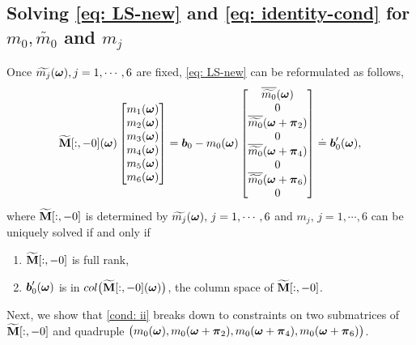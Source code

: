 \subsection{Solving \eqref{eq: LS-new} and \eqref{eq: identity-cond} for $m_0,\widetilde{m_0}$ and $m_j$}\label{subsec: compute-m0}
Once $\widetilde{m_{j}}(\boldsymbol{\omega}), j= 1,\cdots, 6$ are fixed, \eqref{eq: LS-new} can be reformulated as follows,
\begin{align}\label{eq: mj-eq}
\widetilde{\mathbf{M}}[:,-0](\boldsymbol{\omega}) 
\begin{bmatrix}
m_1(\boldsymbol{\omega})\\
m_2(\boldsymbol{\omega})\\
m_3(\boldsymbol{\omega})\\
m_4(\boldsymbol{\omega})\\
m_5(\boldsymbol{\omega})\\
m_6(\boldsymbol{\omega})
\end{bmatrix}
= \boldsymbol{b}_0 - m_0(\boldsymbol{\omega})
\begin{bmatrix}
 \overline{\widetilde{m_0}}(\boldsymbol{\omega})\\
 0\\
\overline{\widetilde{m_{0}}}(\boldsymbol{\omega} + \boldsymbol{\pi}_{2})\\
0\\
\overline{\widetilde{m_{0}}}(\boldsymbol{\omega} + \boldsymbol{\pi}_{4})\\
0\\
\overline{\widetilde{m_{0}}}(\boldsymbol{\omega} + \boldsymbol{\pi}_{6})\\
0
\end{bmatrix} \doteq \boldsymbol{b}_0'(\boldsymbol{\omega}),
\end{align}
where $\widetilde{\mathbf{M}}[:,-0]$ is determined by $\widetilde{m_{j}}(\boldsymbol{\omega}),\,j = 1,\cdots,6$ 
and $m_j,\,j=1,\cdots,6$ can be uniquely solved if and only if
\hspace{-1em}
\begin{enumerate}[leftmargin=.5in]
\item[\mylabel{cond: i}{(\ref{subsec: compute-m0}.i)}] $\widetilde{\mathbf{M}}[:,-0]$ is full rank,%
\item[\mylabel{cond: ii}{(\ref{subsec: compute-m0}.ii)}] $\boldsymbol{b}_0'(\boldsymbol{\omega})$ is in $col\big(\widetilde{\mathbf{M}}[:,-0](\boldsymbol{\omega})\big)$, the column space of $\widetilde{\mathbf{M}}[:,-0]$.%
\end{enumerate}
Next, we show that \ref{cond: ii} breaks down to constraints on two submatrices of $\widetilde{\mathbf{M}}[:,-0]$ and quadruple $\big( m_0(\boldsymbol{\omega}),m_0(\boldsymbol{\omega}+\boldsymbol{\pi}_2), m_0(\boldsymbol{\omega} +\boldsymbol{\pi}_4), m_0(\boldsymbol{\omega}+\boldsymbol{\pi}_6) \big)$.

